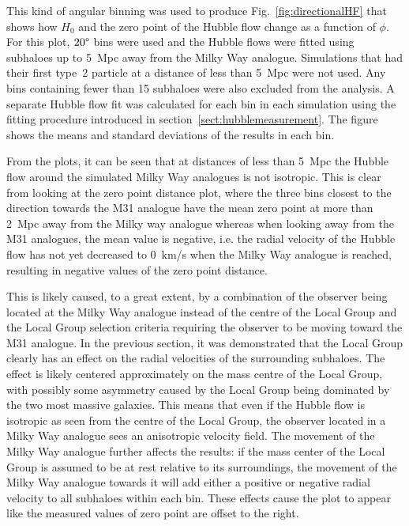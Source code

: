 \documentclass[english, twoside]{HYgradu}
\begin{document}
This kind of angular binning was used to produce Fig.~\ref{fig:directionalHF} that shows how $H_0$ and the zero point of the Hubble flow change as a function of $\phi$. For this plot, $20 \degree$ bins were used and the Hubble flows were fitted using subhaloes up to 5~Mpc away from the Milky Way analogue. Simulations that had their first type~2 particle at a distance of less than 5~Mpc were not used. Any bins containing fewer than 15 subhaloes were also excluded from the analysis. A separate Hubble flow fit was calculated for each bin in each simulation using the fitting procedure introduced in section~\ref{sect:hubblemeasurement}. The figure shows the means and standard deviations of the results in each bin.

From the plots, it can be seen that at distances of less than 5~Mpc the Hubble flow around the simulated Milky Way analogues is not isotropic. This is clear from looking at the zero point distance plot, where the three bins closest to the direction towards the M31 analogue have the mean zero point at more than 2~Mpc away from the Milky way analogue whereas when looking away from the M31 analogues, the mean value is negative, i.e. the radial velocity of the Hubble flow has not yet decreased to 0~km/s when the Milky Way analogue is reached, resulting in negative values of the zero point distance.

This is likely caused, to a great extent, by a combination of the observer being located at the Milky Way analogue instead of the centre of the Local Group and the Local Group selection criteria requiring the observer to be moving toward the M31 analogue. In the previous section, it was demonstrated that the Local Group clearly has an effect on the radial velocities of the surrounding subhaloes. The effect is likely centered approximately on the mass centre of the Local Group, with possibly some asymmetry caused by the Local Group being dominated by the two most massive galaxies. This means that even if the Hubble flow is isotropic as seen from the centre of the Local Group, the observer located in a Milky Way analogue sees an anisotropic velocity field.
The movement of the Milky Way analogue further affects the results: if the mass center of the Local Group is assumed to be at rest relative to its surroundings, the movement of the Milky Way analogue towards it will add either a positive or negative radial velocity to all subhaloes within each bin. These effects cause the plot to appear like the measured values of zero point are offset to the right.
\end{document}
